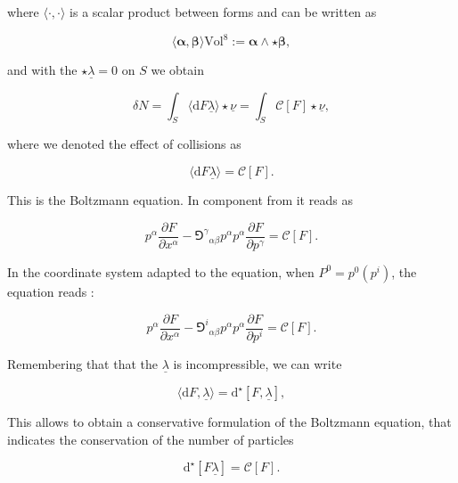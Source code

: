 where $\langle\cdot,\cdot\rangle$ is a scalar product between forms and can be written as

\begin{equation}
\langle\boldsymbol{\alpha},\boldsymbol{\beta}\rangle\text{Vol}^8 := \boldsymbol{\alpha}\wedge\star\boldsymbol{\beta},
\end{equation}

and with the $\star\underline{\lambda}=0$ on $S$ we obtain 

\begin{equation}
\delta N = \int_S\langle\text{d}F\underline{\lambda}\rangle\star\underline{\nu} = \int_S\mathcal{C}[F]\star\underline{\nu},
\end{equation}

where we denoted the effect of collisions as

\begin{equation}
\langle\text{d}F\underline{\lambda}\rangle = \mathcal{C}[F].
\end{equation}

This is the Boltzmann equation. In component from it reads as 

\begin{equation}
p^{\alpha}\frac{\partial F}{\partial x^{\alpha}} - {\Game^{\gamma}}_{\alpha\beta}p^{\alpha}p^{\alpha}\frac{\partial F}{\partial p^{\gamma}} =\mathcal{C}[F].
\end{equation}

In the coordinate system adapted to the equation, when $P^0 = p^0(p^i)$, the equation reads \cite{Cercignani:2002}:

\begin{equation}
p^{\alpha}\frac{\partial F}{\partial x^{\alpha}} - {\Game^{i}}_{\alpha\beta}p^{\alpha}p^{\alpha}\frac{\partial F}{\partial p^{i}} =\mathcal{C}[F].
\end{equation}

Remembering that that the $\underline{\lambda}$ is incompressible, we can write

\begin{equation}
\langle\text{d}F,\underline{\lambda}\rangle = \text{d}^{\star}[F,\underline{\lambda}],
\end{equation}

This allows to obtain a conservative formulation of the Boltzmann equation, that indicates the conservation of the number of particles \cite{Cardall:2002bp}

\begin{equation}
\text{d}^{\star}[F\underline{\lambda}] = \mathcal{C}[F].
\end{equation}

